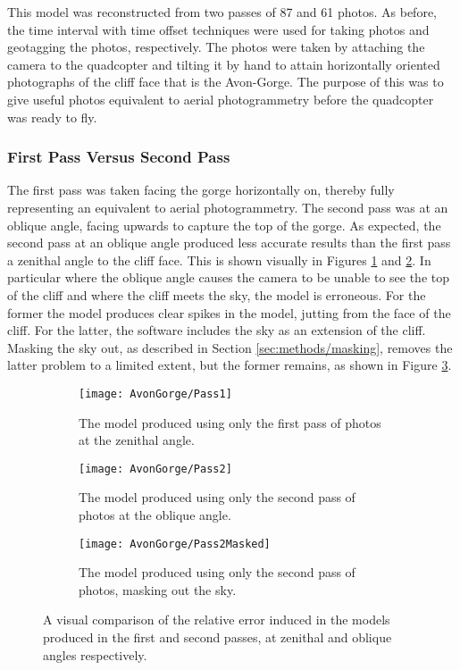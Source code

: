 This model was reconstructed from two passes of 87 and 61 photos. As before, the
time interval with time offset techniques were used for taking photos and
geotagging the photos, respectively. The photos were taken by attaching the
camera to the quadcopter and tilting it by hand to attain horizontally oriented
photographs of the cliff face that is the Avon-Gorge. The purpose of this was to
give useful photos equivalent to aerial photogrammetry before the quadcopter was
ready to fly.

\subsubsection{First Pass Versus Second Pass}
\label{sec:results/avon-gorge/passes}

The first pass was taken facing the gorge horizontally on, thereby fully
representing an equivalent to aerial photogrammetry. The second pass was at an
oblique angle, facing upwards to capture the top of the gorge. As expected, the
second pass at an oblique angle produced less accurate results than the first
pass a zenithal angle to the cliff face. This is shown visually in Figures
\ref{img:avon-gorge/pass-1} and \ref{img:avon-gorge/pass-2}. In particular where
the oblique angle causes the camera to be unable to see the top of the cliff and
where the cliff meets the sky, the model is erroneous. For the former the model
produces clear spikes in the model, jutting from the face of the cliff. For the
latter, the software includes the sky as an extension of the cliff. Masking the
sky out, as described in Section \ref{sec:methods/masking}, removes the latter
problem to a limited extent, but the former remains, as shown in Figure
\ref{img:avon-gorge/pass-2/masked}.

\begin{figure}
    \centering
    \begin{subfigure}[b]{0.45\textwidth}
        \texttt{[image: AvonGorge/Pass1]}
        \caption{The model produced using only the first pass of photos at the
        zenithal angle.}
        \label{img:avon-gorge/pass-1}
    \end{subfigure}
    \begin{subfigure}[b]{0.45\textwidth}
        \texttt{[image: AvonGorge/Pass2]}
        \caption{The model produced using only the second pass of photos at the
        oblique angle.}
        \label{img:avon-gorge/pass-2}
    \end{subfigure}
    \begin{subfigure}[b]{0.9\textwidth}
        \texttt{[image: AvonGorge/Pass2Masked]}
        \caption{The model produced using only the second pass of photos,
        masking out the sky.}
        \label{img:avon-gorge/pass-2/masked}
    \end{subfigure}
    \caption{A visual comparison of the relative error induced in the models
    produced in the first and second passes, at zenithal and oblique angles
    respectively.}
    \label{img:avon-gorge/passes}
\end{figure}

